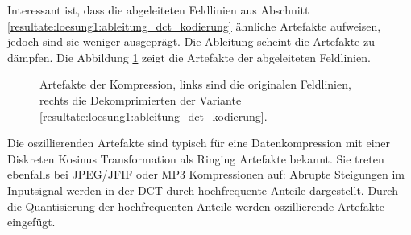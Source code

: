 Interessant ist, dass die abgeleiteten Feldlinien aus Abschnitt \ref{resultate:loesung1:ableitung_dct_kodierung} ähnliche Artefakte aufweisen, jedoch sind sie weniger ausgeprägt. Die Ableitung scheint die Artefakte zu dämpfen. Die Abbildung \ref{resultate:loesung1:dct:randbehandlung:jvhartefakte_loesung6} zeigt die Artefakte der abgeleiteten Feldlinien.\\
\begin{figure}[!htbp]
	\center
	\caption{Artefakte der Kompression, links sind die originalen Feldlinien, rechts die Dekomprimierten der Variante \ref{resultate:loesung1:ableitung_dct_kodierung}.}
	\label{resultate:loesung1:dct:randbehandlung:jvhartefakte_loesung6}
\end{figure}
Die oszillierenden Artefakte sind typisch für eine Datenkompression mit einer Diskreten Kosinus Transformation als Ringing Artefakte \cite{wiki:ringing:artefacts} bekannt. Sie treten ebenfalls bei JPEG/JFIF oder MP3 Kompressionen auf: Abrupte Steigungen im Inputsignal werden in der DCT durch hochfrequente Anteile dargestellt. Durch die Quantisierung der hochfrequenten Anteile werden oszillierende Artefakte eingefügt.\\
